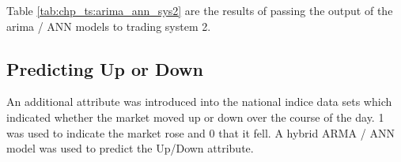 

Table \ref{tab:chp_ts:arima_ann_sys2} are the results of passing the output of the arima / ANN models to trading system 2.



\subsection{Predicting Up or Down}
An additional attribute was introduced into the national indice data sets which indicated whether the market moved up or down over the course of the day. 1 was used to indicate the market rose and 0 that it fell. A hybrid ARMA / ANN model was used to predict the Up/Down attribute. 